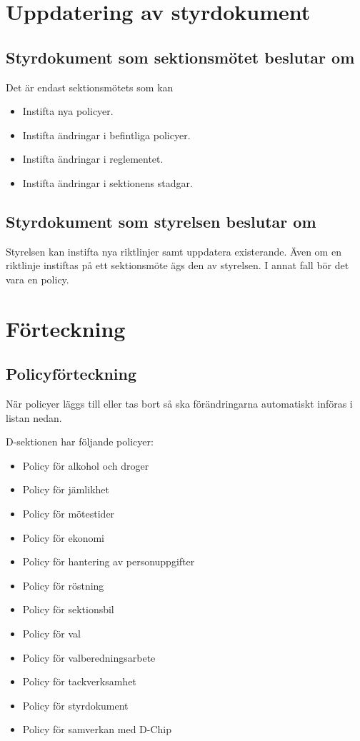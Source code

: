\documentclass[]{dsekprotokoll}
\begin{document}
\section{Uppdatering av styrdokument}
\subsection{Styrdokument som sektionsmötet beslutar om}
Det är endast sektionsmötets som kan
\begin{itemize}
    \item Instifta nya policyer.
    \item Instifta ändringar i befintliga policyer.
    \item Instifta ändringar i reglementet.
    \item Instifta ändringar i sektionens stadgar.
\end{itemize}

\subsection{Styrdokument som styrelsen beslutar om}
Styrelsen kan instifta nya riktlinjer samt uppdatera existerande. Även om en riktlinje instiftas på ett sektionsmöte ägs den av styrelsen. I annat fall bör det vara en policy.

\section{Förteckning}

\subsection{Policyförteckning}
När policyer läggs till eller tas bort så ska förändringarna automatiskt införas i listan nedan.

D-sektionen har följande policyer:
\begin{itemize}
    \item Policy för alkohol och droger
    \item Policy för jämlikhet
    \item Policy för mötestider
    \item Policy för ekonomi
    \item Policy för hantering av personuppgifter
    \item Policy för röstning
    \item Policy för sektionsbil
    \item Policy för val
    \item Policy för valberedningsarbete
    \item Policy för tackverksamhet
    \item Policy för styrdokument
    \item Policy för samverkan med D-Chip
\end{itemize}
\end{document}
